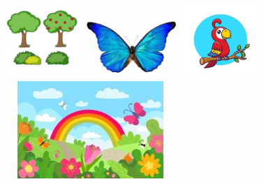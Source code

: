 \includegraphics[width=1.08333in,height=1.19792in]{media/image110.jpg}
%
\includegraphics[width=1.47778in,height=0.91667in]{media/image111.jpg}
%
\includegraphics[width=1.11458in,height=1.08403in]{media/image112.jpg}
%
\includegraphics[width=2.53125in,height=1.44792in]{media/image113.jpg}

